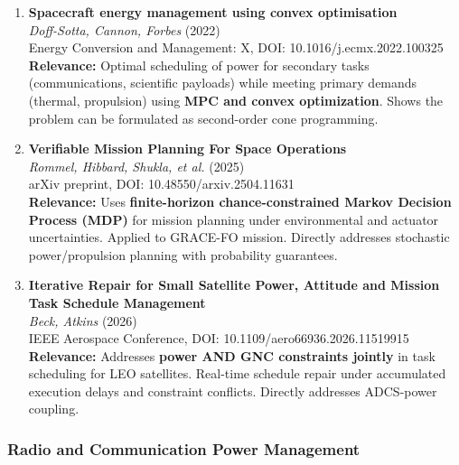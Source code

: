 \documentclass[11pt]{article}
\begin{document}
\begin{enumerate}[label=\textbf{\arabic*.}]
    \item \textbf{Spacecraft energy management using convex optimisation}\\
    \textit{Doff-Sotta, Cannon, Forbes} (2022)\\
    Energy Conversion and Management: X, DOI: 10.1016/j.ecmx.2022.100325\\
    \textbf{Relevance:} Optimal scheduling of power for secondary tasks (communications, scientific payloads) while meeting primary demands (thermal, propulsion) using \textbf{MPC and convex optimization}. Shows the problem can be formulated as second-order cone programming.

    \item \textbf{Verifiable Mission Planning For Space Operations}\\
    \textit{Rommel, Hibbard, Shukla, et al.} (2025)\\
    arXiv preprint, DOI: 10.48550/arxiv.2504.11631\\
    \textbf{Relevance:} Uses \textbf{finite-horizon chance-constrained Markov Decision Process (MDP)} for mission planning under environmental and actuator uncertainties. Applied to GRACE-FO mission. Directly addresses stochastic power/propulsion planning with probability guarantees.

    \item \textbf{Iterative Repair for Small Satellite Power, Attitude and Mission Task Schedule Management}\\
    \textit{Beck, Atkins} (2026)\\
    IEEE Aerospace Conference, DOI: 10.1109/aero66936.2026.11519915\\
    \textbf{Relevance:} Addresses \textbf{power AND GNC constraints jointly} in task scheduling for LEO satellites. Real-time schedule repair under accumulated execution delays and constraint conflicts. Directly addresses ADCS-power coupling.
\end{enumerate}

\subsubsection{Radio and Communication Power Management}
\end{document}
